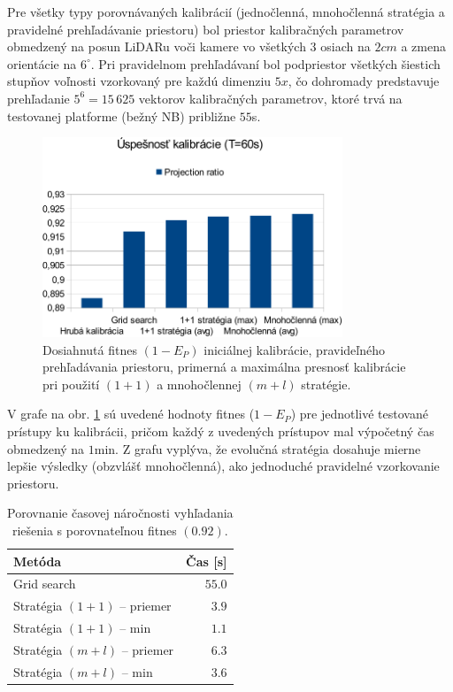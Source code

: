 \documentclass[12pt, a4paper]{article}
\begin{document}
Pre všetky typy porovnávaných kalibrácií (jednočlenná, mnohočlenná stratégia a pravidelné prehľadávanie priestoru) bol priestor kalibračných parametrov obmedzený na posun LiDARu voči kamere vo všetkých $3$ osiach na $2cm$ a zmena orientácie na $6^\circ$. Pri pravidelnom prehľadávaní bol podpriestor všetkých šiestich stupňov voľnosti vzorkovaný pre každú dimenziu $5x$, čo dohromady predstavuje prehľadanie $5^6 = 15\,625$ vektorov kalibračných parametrov, ktoré trvá na testovanej platforme (bežný NB) približne $55$s.

\begin{figure}[h]
\center
	\includegraphics[width=0.8\textwidth]{fig/results.pdf}
\caption{Dosiahnutá fitnes $(1-E_P)$ iniciálnej kalibrácie, pravideľného prehľadávania priestoru, primerná a maximálna presnosť kalibrácie pri použití $(1+1)$ a mnohočlennej $(m+l)$ stratégie.\label{fig:results-accuracy}}
\end{figure}

V grafe na obr. \ref{fig:results-accuracy} sú uvedené hodnoty fitnes ($1-E_P$) pre jednotlivé testované prístupy ku kalibrácii, pričom každý z uvedených prístupov mal výpočetný čas obmedzený na $1$min. Z grafu vyplýva, že evolučná stratégia dosahuje mierne lepšie výsledky (obzvlášť mnohočlenná), ako jednoduché pravidelné vzorkovanie priestoru.

\begin{table}
	\center
	\begin{tabular}{|l|r|}
		\hline
		\textbf{Metóda} & \textbf{Čas [s]}\\
		\hline\hline
		Grid search & $55.0$ \\\hline
		Stratégia $(1+1)$ -- priemer & $3.9$ \\\hline
		Stratégia $(1+1)$ -- min     & $1.1$ \\\hline
		Stratégia $(m+l)$ -- priemer & $6.3$ \\\hline
		Stratégia $(m+l)$ -- min     & $3.6$ \\\hline
	\end{tabular}
	\caption{Porovnanie časovej náročnosti vyhľadania riešenia s porovnateľnou fitnes $(0.92)$.\label{tab:results-time}}
\end{table}
\end{document}
